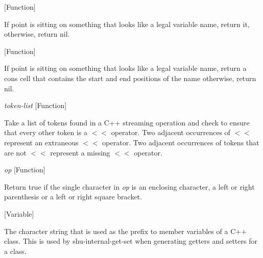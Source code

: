 \vspace{1em}
\noindent
{}
\usebox{\funcname}
 \hfill [Function]

\begin{doc-string}
If point is sitting on something that looks like a legal variable name, return it,
otherwise, return nil.
\end{doc-string}

\vspace{1em}
\noindent
{}
\usebox{\funcname}
 \hfill [Function]

\begin{doc-string}
If point is sitting on something that looks like a legal variable name,
return a cons cell that contains the start and end positions of the name
otherwise, return nil.
\end{doc-string}

\vspace{1em}
\noindent
{}
\usebox{\funcname}\emph{token-list}
 \hfill [Function]

\begin{doc-string}
Take a list of tokens found in a C++ streaming operation and check to
ensure that every other token is a $<$$<$ operator.  Two adjacent occurrences of $<$$<$
represent an extraneous $<$$<$ operator.  Two adjacent occurrences of tokens that
are not $<$$<$ represent a missing $<$$<$ operator.
\end{doc-string}

\vspace{1em}
\noindent
{}
\usebox{\funcname}\emph{op}
 \hfill [Function]

\begin{doc-string}
Return true if the single character in \emph{op} is an enclosing character, a left
or right parenthesis or a left or right square bracket.
\end{doc-string}

\vspace{1em}
\noindent
{}
\usebox{\funcname}
 \hfill [Variable]

\begin{doc-string}
The character string that is used as the prefix to member variables of a C++ class.
This is used by shu-internal-get-set when generating getters and setters for a class.
\end{doc-string}

